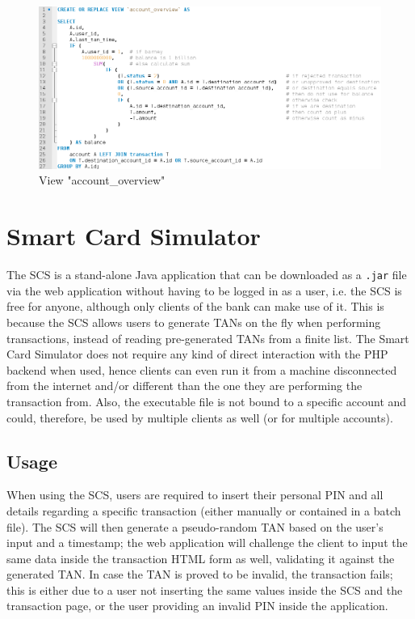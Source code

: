 \begin{description}
\begin{figure}[h!tbp]
	\centering
	\includegraphics[width=\textwidth]{figures/code_account_overview}
	\caption{View "account\_overview"}
	\label{figure:accountoverviewfigure}
\end{figure}

\end{description}

\clearpage
\section{Smart Card Simulator}\label{section:scs}
The SCS is a stand-alone Java application that can be downloaded as a \texttt{.jar} file via the web application without having to be logged in as a user, i.e. the SCS is free for anyone, although only clients of the bank can make use of it. This is because the SCS allows users to generate TANs on the fly when performing transactions, instead of reading pre-generated TANs from a finite list. \newline
The \gnb{} Smart Card Simulator does not require any kind of direct interaction with the PHP backend when used, hence clients can even run it from a machine disconnected from the internet and/or different than the one they are performing the transaction from. Also, the executable file is not bound to a specific account and could, therefore, be used by multiple clients as well (or for multiple accounts).
\subsection{Usage}
When using the SCS, users are required to insert their personal PIN and all details regarding a specific transaction (either manually or contained in a batch file). The SCS will then generate a pseudo-random TAN based on the user's input and a timestamp; the web application will challenge the client to input the same data inside the transaction HTML form as well, validating it against the generated TAN. In case the TAN is proved to be invalid, the transaction fails; this is either due to a user not inserting the same values inside the SCS and the transaction page, or the user providing an invalid PIN inside the application.\newline


